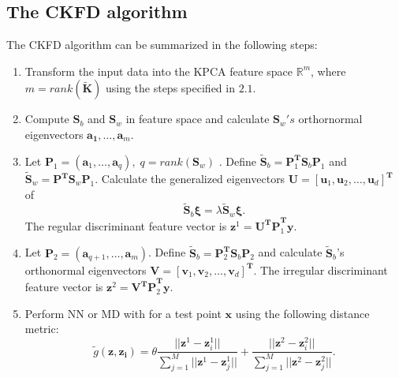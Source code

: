 \documentclass[7 pt]{article}
\begin{document}
\begin{multicols}{2}
 \section{The CKFD algorithm}
 The CKFD algorithm can be summarized in the following steps:
 \begin{enumerate}
 \item Transform the input data into the KPCA feature space $\mathbb{R}^{m}$, where $m=rank(\mathbf{\tilde{K}})$ using the steps specified in $2.1$.
  \item Compute $\mathbf{S}_{b}$ and $\mathbf{S}_{w}$ in feature space
 and calculate $\mathbf{S}_{w}'s$ orthornormal eigenvectors $\mathbf{\mathbf{a}_{1}},\dots,\mathbf{a}_{m}$. 
 \item Let $\mathbf{P}_{1}=(\mathbf{a}_{1},\dots,\mathbf{a}_{q}), \; q=rank(\mathbf{S}_{w})$ . Define $\mathbf{\tilde{S}}_{b}= \mathbf{P}_{1}^{\mathbf{T}}\mathbf{S}_{b}\mathbf{P}_{1}$ and 
 $\mathbf{\tilde{S}}_{w}=\mathbf{P}^{\mathbf{T}}\mathbf{S}_{w}\mathbf{P}_{1}$. Calculate the generalized eigenvectors $\mathbf{U}=[\mathbf{u}_{1},\mathbf{u}_{2},\dots,\mathbf{u}_{d}]^{\mathbf{T}}$ of 
\begin{equation}
\mathbf{\tilde{S}}_{b}\boldsymbol{\xi}=\lambda\mathbf{\tilde{S}}_{w}\boldsymbol{\xi}. 
\end{equation} 
  The regular discriminant feature vector is $\mathbf{z}^{1}=\mathbf{U^{T}P}_{1}^{\mathbf{T}}\mathbf{y}.$
 \item Let $\mathbf{P}_{2}=(\mathbf{a}_{q+1},\dots,\mathbf{a}_{m})$.
 Define $\mathbf{\tilde{S}}_{b}=\mathbf{P}_{2}^{\mathbf{T}}\mathbf{S}_{b}\mathbf{P}_{2}$ and calculate $\mathbf{\tilde{S}}_{b}$'s orthonormal eigenvectors $\mathbf{V}=[\mathbf{v}_{1},\mathbf{v}_{2},\dots,\mathbf{v}_{d}]^{\mathbf{T}}$. The irregular discriminant feature vector is $ \mathbf{z}^{2}= \mathbf{V^{T}P}^{\mathbf{T}}_{2}\mathbf{y}.$
\item Perform NN or MD with for a test point $\mathbf{x}$ using the following distance metric:
\begin{equation}
\tilde{g}(\mathbf{z},\mathbf{z_{i}})= \theta \frac{\vert \vert \mathbf{z}^{1}-\mathbf{z}^{1}_{i}\vert \vert}{\displaystyle\sum_{j=1}^{M}\vert \vert \mathbf{z}^{1}-\mathbf{z}^{1}_{j}\vert \vert} + \frac{\vert \vert \mathbf{z}^{2}-\mathbf{z}^{2}_{i}\vert \vert}{\displaystyle\sum_{j=1}^{M}\vert \vert \mathbf{z}^{2}-\mathbf{z}^{2}_{j}\vert \vert} .
\end{equation}

  \end{enumerate} 


\end{multicols}
\end{document}
